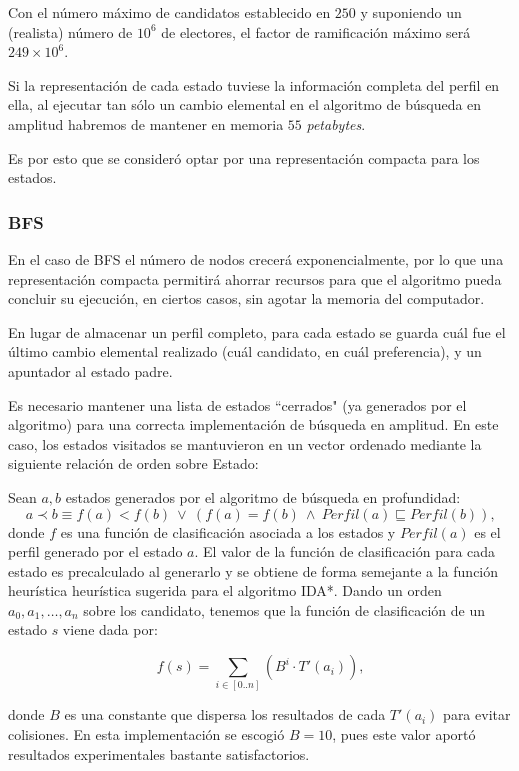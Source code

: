 \documentclass[letterpaper,12pt, titlepage]{article}
\begin{document}
Con el número máximo de candidatos establecido en
$250$ y suponiendo un (realista) número de $10^6$ de electores,
el factor de ramificación máximo será $249\times 10^6$.

Si la representación de cada estado tuviese la información
completa del perfil en ella, al ejecutar tan sólo un 
cambio elemental en el algoritmo de
búsqueda en amplitud habremos de mantener en memoria $55$
\textit{petabytes}.

Es por esto que se consideró 
optar por una representación compacta para los estados.

\subsubsection*{BFS}

En el caso de BFS el número de
nodos crecerá exponencialmente, por lo que una representación
compacta permitirá ahorrar recursos para que el algoritmo pueda
concluir su ejecución, en ciertos casos, sin agotar la memoria
del computador.

En lugar de almacenar un perfil completo, para cada estado
se guarda cuál fue el último cambio elemental realizado (cuál
candidato, en cuál preferencia), y un apuntador al estado padre.

Es necesario mantener una lista de estados ``cerrados" (ya
generados por el algoritmo) para una correcta implementación
de búsqueda en amplitud. En este caso, los estados visitados
se mantuvieron en un vector ordenado mediante la siguiente
relación de orden sobre Estado:

Sean $a, b$ estados generados por el algoritmo de búsqueda en
profundidad:
$$a \prec b \equiv f(a) < f(b) \ \lor \ (f(a) = f(b) \ \land \ Perfil(a) \sqsubseteq Perfil(b))\mbox{,}$$
\noindent donde $f$ es una función de clasificación asociada a los
estados y $Perfil(a)$ es el perfil generado por el estado
$a$. El valor de la función de clasificación para cada estado 
es precalculado al generarlo y se obtiene de forma semejante
a la función heurística heurística sugerida para el algoritmo
IDA*. Dando un orden $a_0, a_1, \ldots, a_n$ sobre los candidato,
tenemos que la función de clasificación de un estado $s$ viene
dada por:

$$\displaystyle f(s) = \sum_{i\in [0..n]} (B^i\cdot T'(a_i))\mbox{,}$$
    
\noindent donde $B$ es una constante que dispersa los
resultados de cada $T'(a_i)$ para evitar colisiones.
En esta implementación se escogió $B=10$, pues
este valor aportó resultados experimentales bastante satisfactorios.
\end{document}
